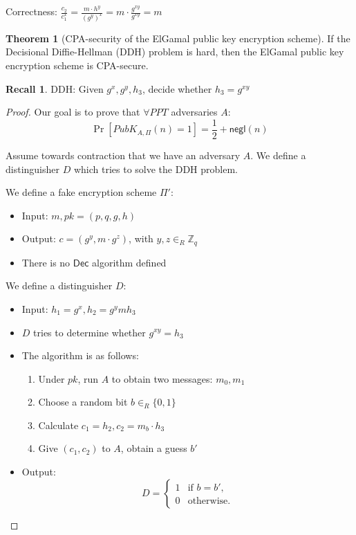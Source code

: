 \documentclass[11pt]{article}
\theoremstyle{definition}
\newtheorem{theorem}{Theorem}[section]
\newtheorem{recall}{Recall}[section]
\theoremstyle{proof}
\newcommand{\Dec}{\mathsf{Dec}}
\newcommand{\negl}{\mathsf{negl}}
\begin{document}
Correctness: $\frac{c_2}{c_1^x} = \frac{m \cdot h^y}{(g^y)^x} = m \cdot \frac{g^{xy}}{g^{xy}} = m$

\begin{theorem}[CPA-security of the ElGamal public key encryption scheme]
	If the Decisional Diffie-Hellman (DDH) problem is hard, then the ElGamal public key encryption scheme is CPA-secure.
\end{theorem}

\begin{recall}
	DDH: Given $g^x, g^y, h_3$, decide whether $h_3 = g^{xy}$
\end{recall}

\begin{proof}
	Our goal is to prove that $\forall PPT$ adversaries $A$:
	$$
	\Pr[PubK_{A, \Pi}(n) = 1] = \frac{1}{2} + \negl(n)
	$$

	Assume towards contraction that we have an adversary $A$. We define a distinguisher $D$ which tries to solve the DDH problem.
	
	We define a fake encryption scheme $\Pi'$:
	\begin{itemize}
		\item Input: $m, pk = (p, q, g, h)$
		\item Output: $c = (g^y, m \cdot g^z)$, with $y, z \in_R \mathbb{Z}_q$
		\item There is no $\Dec$ algorithm defined
	\end{itemize}
	
	We define a distinguisher $D$:
	\begin{itemize}
		\item Input: $h_1 = g^x, h_2 = g^ym h_3$
		\item $D$ tries to determine whether $g^{xy} = h_3$
		\item The algorithm is as follows:
		\begin{enumerate}
			\item Under $pk$, run $A$ to obtain two messages: $m_0, m_1$
			\item Choose a random bit $b \in_R \{0,1\}$
			\item Calculate $c_1 = h_2, c_2 = m_b \cdot h_3$
			\item Give $(c_1, c_2)$ to $A$, obtain a guess $b'$
		\end{enumerate}
		\item Output:
		$$
		D =
		\begin{cases}
			1 & \text{if } b = b', \\
			0 & \text{otherwise}.
		\end{cases}
		$$
	\end{itemize}
	

\end{proof}
\end{document}
